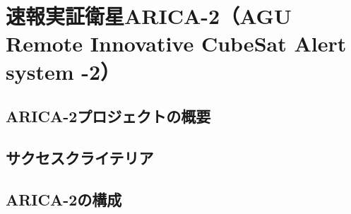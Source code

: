 \chapter{速報実証衛星ARICA-2（AGU Remote Innovative CubeSat Alert system -2）}
\section{ARICA-2プロジェクトの概要}
\section{サクセスクライテリア}
\section{ARICA-2の構成}